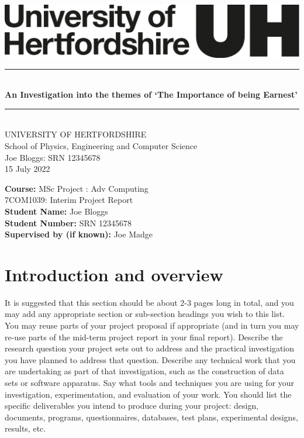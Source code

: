 \documentclass[a4paper, notitlepage, 11pt]{article}
\newcommand{\projecttitle}{An Investigation into the themes of `The Importance of being Earnest'}
\newcommand{\studentname}{Joe Bloggs}
\newcommand{\studentnumber}{SRN 12345678}
\newcommand{\supervisorname}{Joe Madge}
\newcommand{\HRule}{\rule{\linewidth}{0.5mm}}
\newcommand{\doctype}{Interim Project Report}
\newcommand{\coursecode}{7COM1039}
\newcommand{\coursedescr}{MSc Project : Adv Computing}
\newcommand{\reportdate}{15 July 2022}
\begin{document}
\thispagestyle{empty}

\begin{center}
    \vspace{2cm}
    \includegraphics[scale=0.2]{herts-logo-black.png} \\[5cm]
    
    \HRule \\[0.4cm]
    \huge{ \bfseries \projecttitle \\[0.15cm] }
    \HRule \\[1.5cm]
    
    \textsf{\LARGE{UNIVERSITY OF HERTFORDSHIRE\\
    School of Physics, Engineering and Computer Science} \\[2cm]}
    \LARGE{\studentname \enspace : \enspace \studentnumber}\\
    \large{\reportdate } \\[4cm]
    
\end{center}

\large{\textbf{Course: }\coursedescr\\
        \coursecode \enspace : \enspace \doctype \\
    \textbf{Student Name:} \studentname \\
    \textbf{Student Number:} \studentnumber \\
    \textbf{Supervised by (if known):} \supervisorname 
}



\clearpage
\setcounter{page}{1}
\setcounter{tocdepth}{1}
\tableofcontents

\section{Introduction and overview}

It is suggested that this section should be about 2-3 pages long in total, and you may add any appropriate section or sub-section headings you wish to this list. You may reuse parts of your project proposal if appropriate (and in turn you may re-use parts of the mid-term project report in your final report). Describe the research question your project sets out to address and the practical investigation you have planned to address that question. Describe any technical work that you are undertaking as part of that investigation, such as the construction of data sets or software apparatus. Say what tools and techniques you are using for your investigation, experimentation, and evaluation of your work. You should list the specific deliverables you intend to produce during your project: design, documents, programs, questionnaires, databases, test plans, experimental designs, results, etc.
\end{document}
